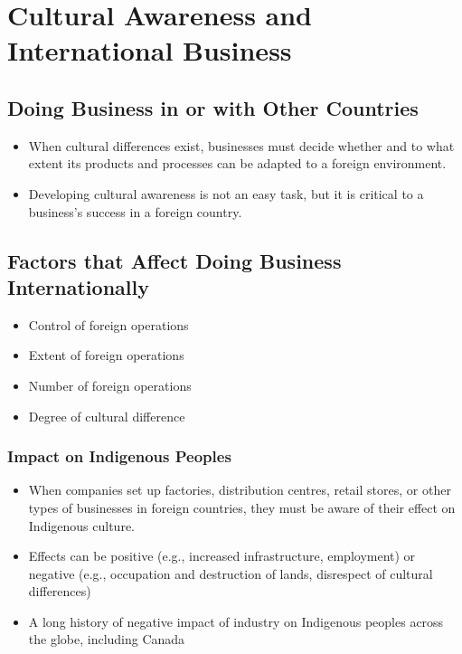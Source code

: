 \section{Cultural Awareness and International Business}

\subsection{Doing Business in or with Other Countries}

\begin{itemize}
    \item When cultural differences exist, businesses must decide whether and to what extent its products and processes can be adapted to a foreign environment.
    \item Developing cultural awareness is not an easy task, but it
    is critical to a business’s success in a foreign country.
\end{itemize}

\subsection{Factors that Affect Doing Business Internationally}

\begin{itemize}
    \item Control of foreign operations
    \item Extent of foreign operations 
    \item Number of foreign operations
    \item Degree of cultural difference
\end{itemize}

\subsubsection{Impact on Indigenous Peoples}

\begin{itemize}
    \item When companies set up factories, distribution centres, retail
    stores, or other types of businesses in foreign countries,
    they must be aware of their effect on Indigenous culture.
    \item Effects can be positive (e.g., increased infrastructure,
    employment) or negative (e.g., occupation and destruction
    of lands, disrespect of cultural differences)
    \item A long history of negative impact of industry on Indigenous
    peoples across the globe, including Canada
\end{itemize}

